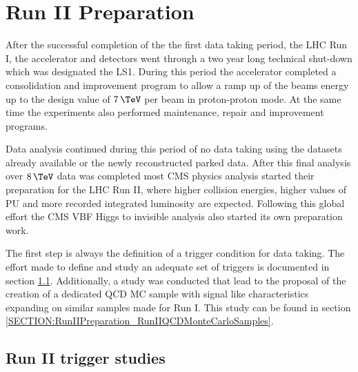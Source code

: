 \chapter{Run II Preparation}
\label{CHAPTER:RunIIPreparation}

\glsresetall %


After the successful completion of the the first data taking period, the \gls{LHC} Run I, the accelerator and detectors went through a two year long technical shut-down which was designated the \gls{LS1}. During this period the accelerator completed a consolidation and improvement program to allow a ramp up of the beams energy up to the design value of $7\,\TeV$ per beam in proton-proton mode. At the same time the experiments also performed maintenance, repair and improvement programs. 

Data analysis continued during this period of no data taking using the datasets already available or the newly reconstructed parked data. After this final analysis over $8\,\TeV$ data was completed most \gls{CMS} physics analysis started their preparation for the \gls{LHC} Run II, where higher collision energies, higher values of \gls{PU} and more recorded integrated luminosity are expected. Following this global effort the \gls{CMS} \gls{VBF} Higgs to invisible analysis also started its own preparation work. 

The first step is always the definition of a trigger condition for data taking. The effort made to define and study an adequate set of triggers is documented in section \ref{SECTION:RunIITriggerStudies}. Additionally, a study was conducted that lead to the proposal of the creation of a dedicated \gls{QCD} \gls{MC} sample with signal like characteristics expanding on similar samples made for Run I. This study can be found in section \ref{SECTION:RunIIPreparation_RunIIQCDMonteCarloSamples}.

\section{Run II trigger studies}
\label{SECTION:RunIITriggerStudies}

% 
%

